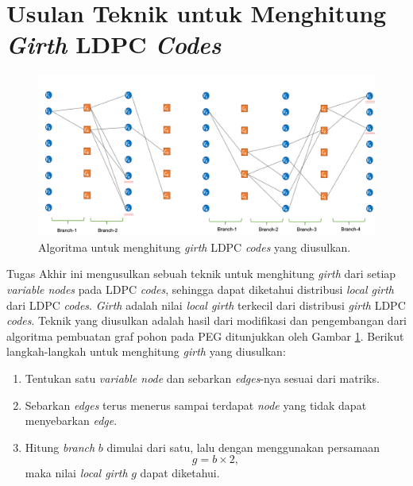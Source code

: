 

\section{Usulan Teknik untuk Menghitung \textit{Girth} LDPC \textit{Codes}}
		\begin{figure}[tb]
	\centering 
	\includegraphics[width=1\textwidth]{pics/hitunggirth}
	\centering 
	\caption{Algoritma untuk menghitung \textit{girth} LDPC \textit{codes} yang diusulkan.}
	\label{fig:girthhitung}
\end{figure}
Tugas Akhir ini mengusulkan sebuah teknik untuk menghitung \textit{girth} dari setiap \textit{variable nodes} pada LDPC \textit{codes}, sehingga dapat diketahui distribusi \textit{local girth} dari LDPC \textit{codes}. \textit{Girth} adalah nilai \textit{local girth} terkecil dari distribusi \textit{girth} LDPC \textit{codes}. Teknik yang diusulkan adalah hasil dari modifikasi dan pengembangan dari algoritma pembuatan graf pohon pada PEG ditunjukkan oleh Gambar \ref{fig:girthhitung}. Berikut langkah-langkah untuk menghitung \textit{girth} yang diusulkan:
\begin{enumerate}
	\item Tentukan satu \textit{variable node} dan sebarkan \textit{edges}-nya sesuai dari matriks.
	\item Sebarkan \textit{edges} terus menerus sampai terdapat \textit{node} yang tidak dapat menyebarkan \textit{edge}.
	\item Hitung \textit{branch} $b$ dimulai dari satu, lalu dengan menggunakan persamaan
	\begin{equation}
	g=b\times 2,
	\end{equation}
	maka nilai \textit{local girth} $g$ dapat diketahui.
\end{enumerate}